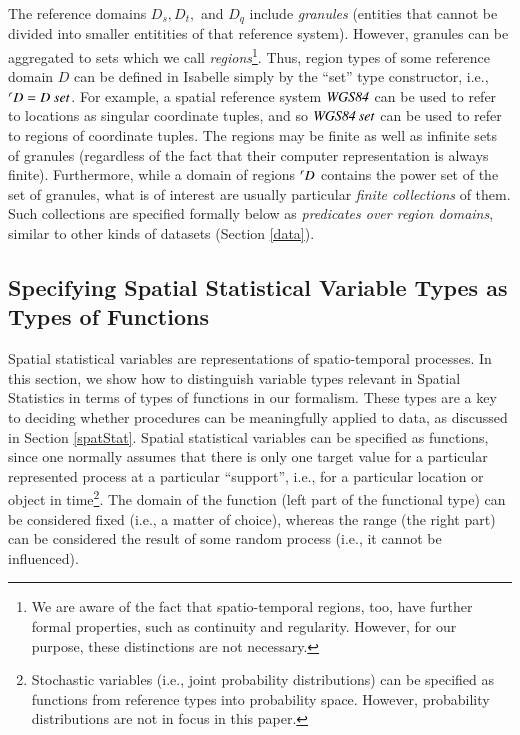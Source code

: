 \documentclass[final,authoryear,1p,times]{elsarticle}
\begin{document}
The reference domains $D_s, D_t,$ and $D_q $ include \textit{granules} (entities that cannot be divided into smaller entitities of that reference system). However, granules can be aggregated to sets which we call \textit{regions}\footnote{We are aware of the fact that spatio-temporal regions, too, have further formal properties, such as continuity and regularity. However, for our purpose, these distinctions are not necessary.}. Thus, region types of some reference domain $D$ can be defined in Isabelle simply by the ``set'' type constructor, i.e.,  $\prescript{r}{}D = D \: set$. For example, a spatial reference system ${\it WGS84}$ can be used to refer to locations as singular coordinate tuples, and so ${\it WGS84 \: set}$ can be used to refer to regions of coordinate tuples. The regions may be finite as well as infinite sets of granules (regardless of the fact that their computer representation is always finite). Furthermore, while a domain of regions $\prescript{r}{}D$ contains the power set of the set of granules, what is of interest are usually particular \textit{finite collections} of them. Such collections are specified  formally below as \textit{predicates over region domains}, similar to other kinds of datasets (Section \ref{data}).

\subsection{Specifying Spatial Statistical Variable Types as Types of Functions}
\label{variables}

Spatial statistical variables are representations of spatio-temporal processes.%
In this section, we show how to distinguish variable types relevant in Spatial Statistics in terms of types of functions in our formalism. These types are a key to deciding whether procedures can be meaningfully applied to data, as discussed in Section \ref{spatStat}. Spatial statistical variables can be specified as functions, since one normally assumes that there is only one target value for a particular represented process at a particular ``support'', i.e., for a particular location or object in time\footnote{Stochastic variables (i.e., joint probability distributions) can be specified as functions from reference types into probability space. However, probability distributions are not in focus in this paper.}. The domain of the function (left part of the functional type) can be considered fixed (i.e., a matter of choice), whereas the range (the right part) can be considered the result of some random process (i.e., it cannot be influenced). 
\end{document}

